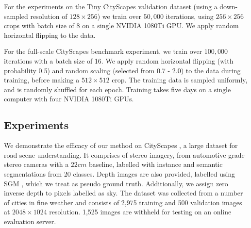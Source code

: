 For the experiments on the Tiny CityScapes validation dataset (using a down-sampled resolution of $128\times256$) we train over $50,000$ iterations, using $256 \times 256$ crops with batch size of 8 on a single NVIDIA 1080Ti GPU. We apply random horizontal flipping to the data.

For the full-scale CityScapes benchmark experiment, we train over $100,000$ iterations with a batch size of 16. We apply random horizontal flipping (with probability 0.5) and random scaling (selected from 0.7 - 2.0) to the data during training, before making a $512 \times 512$ crop. The training data is sampled uniformly, and is randomly shuffled for each epoch. Training takes five days on a single computer with four NVIDIA 1080Ti GPUs.

\subsection{Experiments}
\label{sec:model_analysis_mt}

We demonstrate the efficacy of our method on CityScapes \citep{Cordts2016Cityscapes}, a large dataset for road scene understanding. It comprises of stereo imagery, from automotive grade stereo cameras with a $22cm$ baseline, labelled with instance and semantic segmentations from 20 classes. Depth images are also provided, labelled using SGM \citep{Hirschmuller2008}, which we treat as pseudo ground truth. Additionally, we assign zero inverse depth to pixels labelled as sky. The dataset was collected from a number of cities in fine weather and consists of 2,975 training and 500 validation images at $2048\times1024$ resolution. 1,525 images are withheld for testing on an online evaluation server.

